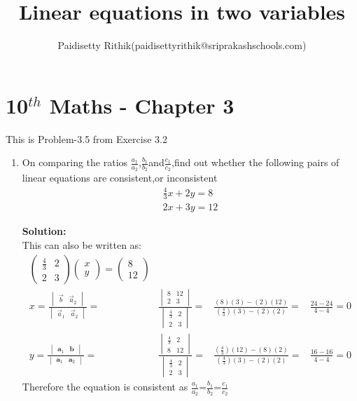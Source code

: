 \documentclass[12pt]{article}
\title{Linear equations in two variables}
\author{Paidisetty Rithik(paidisettyrithik@sriprakashschools.com)}
\newcommand{\myvec}[1]{\ensuremath{\begin{pmatrix}#1\end{pmatrix}}}
\newcommand{\mydet}[1]{\ensuremath{\begin{vmatrix}#1\end{vmatrix}}}
\newcommand{\solution}{\noindent \textbf{Solution: }}
\let\vec\mathbf
\begin{document}
\maketitle
\section*{10$^{th}$ Maths - Chapter 3}
This is Problem-3.5 from Exercise 3.2
\begin{enumerate}
\item On comparing the ratios $\frac{a_1}{a_2}$,$\frac{b_1}{b_2}$and$\frac{c_1}{c_2}$,find out whether the following pairs of linear equations are consistent,or inconsistent\\
\begin{align}
    \frac{4}{3}x+2y=8\\
       2x+3y=12
\end{align}

\solution \\
This can also be written as:
\begin{align}
\myvec{\frac{4}{3}&2\\2&3}\myvec{x\\y} =\myvec{8\\12} \\
x=\frac{\mydet{\Vec{b} & \Vec{a}_2}}{\mydet{ \Vec{a}_1 & \Vec{a}_2}} =&
\frac{\mydet{ 8 & 12 \\ 2 & 3}}{\mydet{\frac{4}{3}&2\\2&3}}=&
\frac{(8)(3)-(2)(12)}{(\frac{4}{3})(3)-(2)(2)}=&
\frac{24-24}{4-4}=0\\
y=\frac{\mydet{\vec{a}_1&\vec{b}}}{\mydet{\vec{a}_1&\vec{a}_2}} =&
\frac{\mydet{\frac{4}{3}&2\\8&12}}{\mydet{\frac{4}{3}&2\\2&3}}=&
\frac{(\frac{4}{3})(12)-(8)(2)}{(\frac{4}{3})(3)-(2)(2)}=&
\frac{16-16}{4-4}=0 
\end{align}
Therefore the equation is consistent as $\frac{a_1}{a_2}$=$\frac{b_1}{b_2}$=$\frac{c_1}{c_2}$
	

\end{enumerate}
\end{document}

